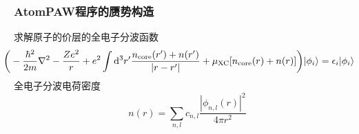 %

\frame
{
	\frametitle{\textrm{AtomPAW}程序的赝势构造}
	求解原子的价层的全电子分波函数
	{\fontsize{9.0pt}{5.2pt}\selectfont$$\hspace*{-17pt}\bigg(-\dfrac{\hbar^2}{2m}\nabla^2-\dfrac{Ze^2}r+e^2\int\mathrm{d}^3r^{\prime}\dfrac{n_{\mathrm{core}}(r^{\prime})+n(r^{\prime})}{|r-r^{\prime}|}+\mu_{\mathrm{XC}}[n_{\mathrm{core}}(r)+n(r)]\bigg)|\phi_i\rangle=\epsilon_i|\phi_i\rangle$$}
	全电子分波电荷密度
	$$n(r)=\sum_{n,l}c_{n,l}\dfrac{|\phi_{n,l}(r)|^2}{4\pi r^2}$$
}

